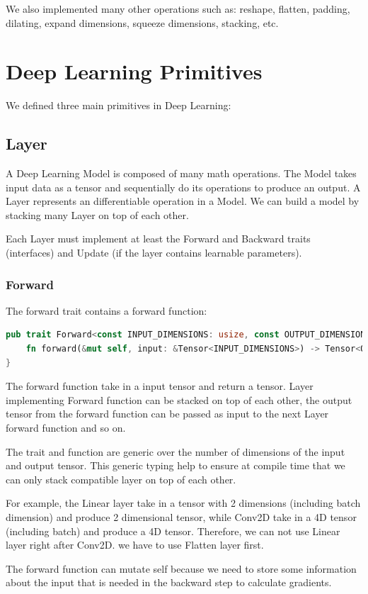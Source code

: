 \documentclass[conference]{IEEEtran}
\begin{document}
We also implemented many other operations such as: reshape, flatten, padding, dilating, expand dimensions, squeeze dimensions, stacking, etc.

\section{Deep Learning Primitives}
We defined three main primitives in Deep Learning:
\subsection{Layer}
A Deep Learning Model is composed of many math operations. The Model takes input data as a tensor and sequentially do its operations to produce an output. 
A Layer represents an differentiable operation in a Model. We can build a model by stacking many Layer on top of each other.

Each Layer must implement at least the Forward and Backward traits (interfaces) and Update (if the layer contains learnable parameters).
\subsubsection{Forward}
The forward trait contains a forward function:

\begin{lstlisting}[language=Rust, caption={Forward Trait}]
pub trait Forward<const INPUT_DIMENSIONS: usize, const OUTPUT_DIMENSIONS: usize> {
    fn forward(&mut self, input: &Tensor<INPUT_DIMENSIONS>) -> Tensor<OUTPUT_DIMENSIONS>;
}
\end{lstlisting}

The forward function take in a input tensor and return a tensor. 
Layer implementing Forward function can be stacked on top of each other, the output tensor from the forward function can be passed as input to the next Layer forward function and so on. 

The trait and function are generic over the number of dimensions of the input and output tensor. This generic typing help to ensure at compile time that we can only stack compatible layer on top of each other.

For example, the Linear layer take in a tensor with 2 dimensions (including batch dimension) and produce 2 dimensional tensor, while Conv2D take in a 4D tensor (including batch) and produce a 4D tensor. Therefore, we can not use Linear layer right after Conv2D. we have to use Flatten layer first. 

The forward function can mutate self because we need to store some information about the input that is needed in the backward step to calculate gradients.
\end{document}
